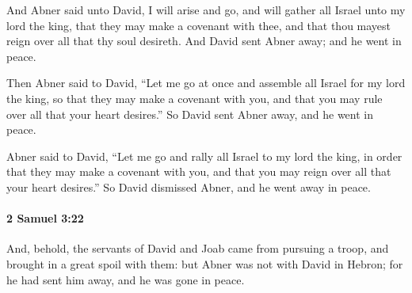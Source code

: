 			\begin{versebox}
					\item[BHS] 
					\item[ASV] And Abner said unto David, I will arise and go, and will gather all Israel unto my lord the king, that they may make a covenant with thee, and that thou mayest reign over all that thy soul desireth. And David sent Abner away; and he went in peace.
					\item[NIV] Then Abner said to David, “Let me go at once and assemble all Israel for my lord the king, so that they may make a covenant with you, and that you may rule over all that your heart desires.” So David sent Abner away, and he went in peace.
					\item[NRSV] Abner said to David, “Let me go and rally all Israel to my lord the king, in order that they may make a covenant with you, and that you may reign over all that your heart desires.” So David dismissed Abner, and he went away in peace.
			\end{versebox}

		\paragraph{2 Samuel 3:22} %
			\label{2SAMUEL-3-22}

			And, behold, the servants of David and Joab came from pursuing a troop, and brought in a great spoil with them: but Abner was not with David in Hebron; for he had sent him away, and he was gone in peace.

